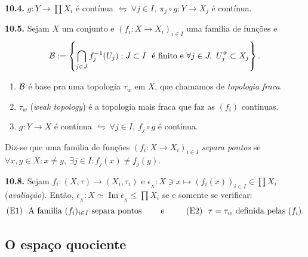 \begin{proposition}
    \textbf{10.4.}  \(g : Y \to \prod X_i\) é contínua \(\leftrightharpoons \ \forall j \in I, \ \pi_j\circ g : Y \to X_j\) é contínua.  
\end{proposition}

\hypertarget{prop105}{}
\begin{proposition}
    \textbf{10.5.} Sejam \(X\) um conjunto e \((f_i : X \to X_i)_{i\in I}\) uma familia de funções e 
    \[\B := \left\{\bigcap_{j\in J} f_j^{-1}(U_j) : J \subset I \ \text{ é finito e } \forall j \in J, \  U_j\ab \subset X_j\right\}.\] 
    \vspace{-0.8cm}
    \begin{enumerate}[label = (\alph*), left = 0.6cm]
        \item \( \mathcal{B}\) é base pra uma topologia \(\tau_w\) em \(X\), que chamamos de \emph{topologia fraca}.
        \item \(\tau_w\) (\emph{weak topology}) é a topologia mais fraca que faz as \((f_i)\) contínuas.
        \item \(g:Y \to X\) é contínua \(\leftrightharpoons \ \forall j \in I, \ f_j \circ g\) é contínua. 
    \end{enumerate}
\end{proposition}

\begin{definition}
    Diz-se que uma familia de funções \((f_i: X \to X_i)_{i\in I}\) \emph{separa pontos} se \(\forall x, y \in X : x \neq y, \ \exists j \in I : f_j(x) \neq f_j(y)\). 
\end{definition}

\hypertarget{prop108}{}
\begin{proposition}
    \textbf{10.8.} Sejam \(f_i : (X,\tau) \to (X_i, \tau_i)\) e \(\epsilon_{_X} : X \ni x \mapsto (f_i(x))_{i\in I} \in \prod X_i\) (\emph{avaliação}). Então, \(\epsilon_{_X}: X \simeq \operatorname{Im}\epsilon_{_X} \leq \prod X_i\) se e somente se verificar: 
    \[\text{(E1) \ A familia }(f_i)_{i\in I} \text{ separa pontos} \hspace{0.8cm}  \text{e \hspace{0.8cm}(E2) \ }\tau = \tau_w \text{ definida pelas } (f_i). \]
\end{proposition}

\subsection*{O espaço quociente}

